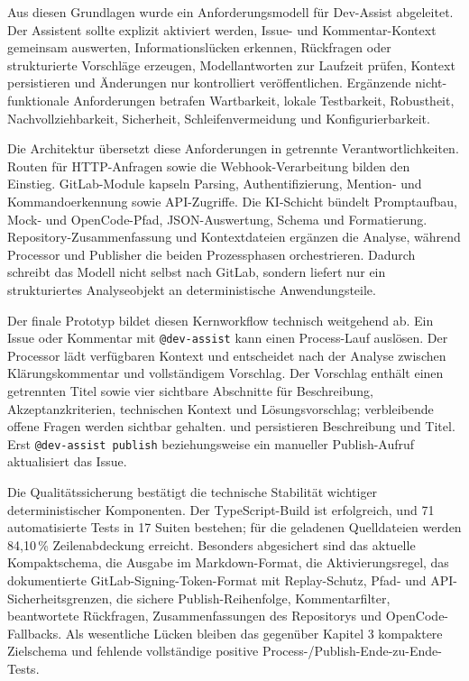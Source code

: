 Aus diesen Grundlagen wurde ein Anforderungsmodell für Dev-Assist abgeleitet. Der Assistent sollte explizit aktiviert werden, Issue- und Kommentar-Kontext gemeinsam auswerten, Informationslücken erkennen, Rückfragen oder strukturierte Vorschläge erzeugen, Modellantworten zur Laufzeit prüfen, Kontext persistieren und Änderungen nur kontrolliert veröffentlichen. Ergänzende nicht-funktionale Anforderungen betrafen Wartbarkeit, lokale Testbarkeit, Robustheit, Nachvollziehbarkeit, Sicherheit, Schleifenvermeidung und Konfigurierbarkeit.

Die Architektur übersetzt diese Anforderungen in getrennte Verantwortlichkeiten. Routen für HTTP-Anfragen sowie die Webhook-Verarbeitung bilden den Einstieg. GitLab-Module kapseln Parsing, Authentifizierung, Mention- und Kommandoerkennung sowie API-Zugriffe. Die KI-Schicht bündelt Promptaufbau, Mock- und OpenCode-Pfad, JSON-Auswertung, Schema und Formatierung. Repository-Zusammenfassung und Kontextdateien ergänzen die Analyse, während Processor und Publisher die beiden Prozessphasen orchestrieren. Dadurch schreibt das Modell nicht selbst nach GitLab, sondern liefert nur ein strukturiertes Analyseobjekt an deterministische Anwendungsteile.

Der finale Prototyp bildet diesen Kernworkflow technisch weitgehend ab. Ein Issue oder Kommentar mit \texttt{@dev-assist} kann einen Process-Lauf auslösen. Der Processor lädt verfügbaren Kontext und entscheidet nach der Analyse zwischen Klärungskommentar und vollständigem Vorschlag. Der Vorschlag enthält einen getrennten Titel sowie vier sichtbare Abschnitte für Beschreibung, Akzeptanzkriterien, technischen Kontext und Lösungsvorschlag; verbleibende offene Fragen werden sichtbar gehalten.  und  persistieren Beschreibung und Titel. Erst \texttt{@dev-assist publish} beziehungsweise ein manueller Publish-Aufruf aktualisiert das Issue.

Die Qualitätssicherung bestätigt die technische Stabilität wichtiger deterministischer Komponenten. Der TypeScript-Build ist erfolgreich, und 71 automatisierte Tests in 17 Suiten bestehen; für die geladenen Quelldateien werden 84,10\,\% Zeilenabdeckung erreicht. Besonders abgesichert sind das aktuelle Kompaktschema, die Ausgabe im Markdown-Format, die Aktivierungsregel, das dokumentierte GitLab-Signing-Token-Format mit Replay-Schutz, Pfad- und API-Sicherheitsgrenzen, die sichere Publish-Reihenfolge, Kommentarfilter, beantwortete Rückfragen, Zusammenfassungen des Repositorys und OpenCode-Fallbacks. Als wesentliche Lücken bleiben das gegenüber Kapitel 3 kompaktere Zielschema und fehlende vollständige positive Process-/Publish-Ende-zu-Ende-Tests.

